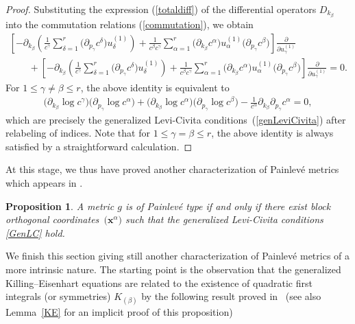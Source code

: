 \documentclass[pdftex]{sigma}
\numberwithin{equation}{section}
\newtheorem{Proposition}[Theorem]{Proposition}
 { \theoremstyle{definition}
\newtheorem{Definition}[Theorem]{Definition}
\newtheorem{Example}[Theorem]{Example}
\newtheorem{Remark}[Theorem]{Remark} }
\newcommand{\kbeta}{k_{\beta}}
\newcommand{\pgamma}{p_{\gamma}}
\begin{document}
\begin{proof}Substituting the expression (\ref{totaldiff}) of the differential operators $D_{\kbeta}$ into the commutation relations (\ref{commutation}), we obtain
 \begin{gather*}
 \left[-\partial_{\kbeta}\left(\frac{1}{c^{\gamma}}\sum_{\delta =1}^{r}\big(\partial_{\pgamma} c^{\delta}\big)u^{(1)}_{\delta}\right) + \frac{1}{c^{\beta} c^{\gamma}}\sum_{\alpha =1}^{r}\big(\partial_{\kbeta} c^{\alpha}\big)u^{(1)}_{\alpha}\big(\partial_{\pgamma} c^{\beta}\big)\right]\frac{\partial}{\partial u^{(1)}_{\gamma}} \\
 \qquad{} +
 \left[-\partial_{\kbeta}\left(\frac{1}{c^{\gamma}}\sum_{\delta =1}^{r}\big(\partial_{\pgamma} c^{\delta}\big)u^{(1)}_{\delta}\right)+\frac{1}{c^{\beta}c^{\gamma}}\sum_{\alpha =1}^{r}\big(\partial_{\kbeta}c^{\alpha}\big)u^{(1)}_{\alpha}\big(\partial_{\pgamma} c^{\beta}\big)\right]\frac{\partial}{\partial u^{(1)}_{\gamma}}=0.
 \end{gather*}
For $1\leq \gamma \neq \beta \leq r$, the above identity is equivalent to
\begin{gather} \label{GenLC}
\big(\partial_{\kbeta} \log c^{\gamma}\big)\big(\partial_{\pgamma} \log c^{\alpha}\big)+\big(\partial_{\kbeta} \log c^{\alpha}\big)\big(\partial_{\pgamma} \log c^{\beta}\big)-\frac{1}{c^{\alpha}}\partial_{\kbeta}\partial_{\pgamma}c^{\alpha}=0,
\end{gather}
which are precisely the generalized Levi-Civita conditions~(\ref{genLeviCivita}) after relabeling of indices. Note that for $1\leq \gamma = \beta \leq r$, the above identity is always satisfied by a straightforward calculation.
\end{proof}

At this stage, we thus have proved another characterization of Painlev\'e metrics which appears in \cite[p.~12]{CR2019}.

\begin{Proposition} \label{PainLC}A metric $g$ is of Painlev\'e type if and only if there exist block orthogonal coordinates~$\big(\textbf{x}^\alpha\big)$ such that the generalized Levi-Civita conditions \eqref{GenLC} hold.
\end{Proposition}

We finish this section giving still another characterization of Painlev\'e metrics of a more intrinsic nature. The starting point is the observation that the generalized Killing--Eisenhart equations are related to the existence of quadratic first integrals (or symmetries) $K_{(\beta)}$ by the following result proved in~\cite[Proposition~5.3]{CR2019} (see also Lemma~\ref{KE} for an implicit proof of this proposition)
\end{document}
